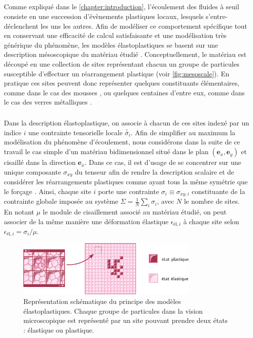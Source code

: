 \subparagraph{}Comme expliqué dans le \autoref{chapter:introduction}, l'écoulement des fluides à seuil consiste en une succession d'évènements plastiques locaux, lesquels s'entre-déclenchent les uns les autres. Afin de modéliser ce comportement spécifique tout en conservant une efficacité de calcul satisfaisante et une modélisation très générique du phénomène, les modèles élastoplastiques se basent sur une description mésoscopique du matériau étudié \cite{nicolas_deformation_2018}. Conceptuellement, le matériau est découpé en une collection de sites représentant chacun un groupe de particules susceptible d'effectuer un réarrangement plastique (voir \autoref{fig:mesoscale}). En pratique ces sites peuvent donc représenter quelques constituants élémentaires, comme dans le cas des mousses \cite{schott_multiscale_2024}, ou quelques centaines d'entre eux, comme dans le cas des verres métalliques \cite{pan_experimental_2008}.

\subparagraph{}Dans la description élastoplastique, on associe à chacun de ces sites indexé par un indice $i$ une contrainte tensorielle locale $\bar{\bar{\sigma}}_i$. Afin de simplifier au maximum la modélisation du phénomène d'écoulement, nous considérons dans la suite de ce travail le cas simple d'un matériau bidimensionnel situé dans le plan $(\mathbf{e}_x, \mathbf{e}_y)$ et cisaillé dans la direction $\mathbf{e}_x$. Dans ce cas, il est d'usage de se concentrer sur une unique composante $\sigma_{xy}$ du tenseur afin de rendre la description scalaire et de considérer les réarrangements plastiques comme ayant tous la même symétrie que le forçage \cite{picard_slow_2005, liu_driving_2016, lin_scaling_2014, ferrero_criticality_2019}. Ainsi, chaque site $i$ porte une contrainte $\sigma_i\equiv\sigma_{xy,i}$ constituante de la contrainte globale imposée au système $\Sigma = \frac{1}{N}\sum_{i}\sigma_i$, avec $N$ le nombre de sites. En notant $\mu$ le module de cisaillement associé au matériau étudié, on peut associer de la même manière une déformation élastique $\epsilon_{\text{él},i}$ à chaque site selon $\epsilon_{\text{él},i} = \sigma_i/\mu$. 

\begin{figure}[h]
	\centering
	\includegraphics[width=0.8\textwidth]{Chapitre4/Figures/Methode/Mesoscaling.pdf}
	\caption{Représentation schématique du principe des modèles élastoplastiques. Chaque groupe de particules dans la vision microscopique est représenté par un site pouvant prendre deux états : élastique ou plastique.}
	\label{fig:mesoscale}
\end{figure}

